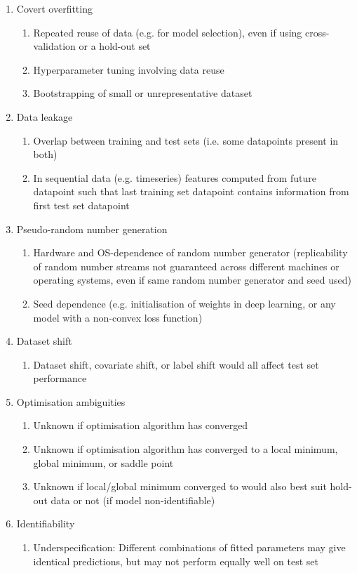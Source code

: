 \documentclass[12pt]{article} %
\begin{document}
\begin{enumerate}
\item Covert overfitting
	\begin{enumerate}
	\item Repeated reuse of data (e.g. for model selection), even if using cross-validation or a hold-out set
	\item Hyperparameter tuning involving data reuse
	\item Bootstrapping of small or unrepresentative dataset
	\end{enumerate}
	
\item Data leakage
	\begin{enumerate}
	\item Overlap between training and test sets (i.e. some datapoints present in both)
	\item In sequential data (e.g. timeseries) features computed from future datapoint such that last training set datapoint contains information from first test set datapoint
	\end{enumerate}

\item Pseudo-random number generation
	\begin{enumerate}
	\item Hardware and OS-dependence of random number generator (replicability of random number streams not guaranteed across different machines or operating systems, even if same random number generator and seed used)
	\item Seed dependence (e.g. initialisation of weights in deep learning, or any model with a non-convex loss function)
	\end{enumerate}

\item Dataset shift
	\begin{enumerate}
	\item Dataset shift, covariate shift, or label shift would all affect test set performance
	\end{enumerate}
	
\item Optimisation ambiguities
	\begin{enumerate}
	\item Unknown if optimisation algorithm has converged
	\item Unknown if optimisation algorithm has converged to a local minimum, global minimum, or saddle point
	\item Unknown if local/global minimum converged to would also best suit hold-out data or not (if model non-identifiable)
	\end{enumerate}
	
\item Identifiability
	\begin{enumerate}
	\item Underspecification: Different combinations of fitted parameters may give identical predictions, but may not perform equally well on test set~\cite{roda2020difficult,d2020underspecification}
	\end{enumerate}

\end{enumerate}
\end{document}
